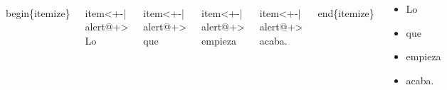 \documentclass[11pt]{beamer}
\begin{document}
\begin{frame}

\begin{block}{}

\begin{columns}
\begin{semiverbatim}\scriptsize
\\begin\{itemize\}
\end{semiverbatim}

\begin{semiverbatim}\scriptsize
 \\item<+-| alert@+> Lo
\end{semiverbatim}

\begin{semiverbatim}\scriptsize
 \\item<+-| alert@+> que
\end{semiverbatim}

\begin{semiverbatim}\scriptsize
 \\item<+-| alert@+> empieza
\end{semiverbatim}

\begin{semiverbatim}\scriptsize
 \\item<+-| alert@+> acaba.
\end{semiverbatim}

\begin{semiverbatim}\scriptsize
\\end\{itemize\}
\end{semiverbatim}



\begin{itemize}
 \item<+-| alert@+> Lo   \item<+-| alert@+> que  \item<+-| alert@+> empieza
\item<+-| alert@+> acaba.
\end{itemize}


\end{columns}
\end{block}






\end{frame}
\end{document}

